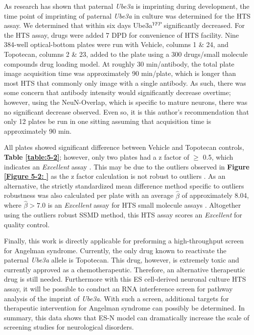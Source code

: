 As research has shown that paternal \textit{Ube3a} is imprinting during development, the time point of imprinting of paternal \textit{Ube3a} in culture was determined for the HTS assay. We determined that within six days Ube3a$^{YFP}$ significantly decreased. For the HTS assay, drugs were added 7 DPD for convenience of HTS facility. Nine 384-well optical-bottom plates were run with Vehicle, columns 1 \& 24, and Topotecan, columns 2 \& 23, added to the plate using a 300 drugs/small molecule compounds drug loading model. At roughly 30 min/antibody, the total plate image acquisition time was approximately 90 min/plate, which is longer than most HTS that commonly only image with a single antibody. As such, there was some concern that antibody intensity would significantly decrease overtime; however, using the NeuN-Overlap, which is specific to mature neurons, there was no significant decrease observed. Even so, it is this author's recommendation that only 12 plates be run in one sitting assuming that acquisition time is approximately 90 min.

All plates showed significant difference between Vehicle and Topotecan controls, \textbf{Table \ref{table:5-2}}; however, only two plates had a z factor of $\geq$ 0.5, which indicates an \textit{Excellent} assay \cite{Zhang1999}. This may be due to the outliers observed in \textbf{Figure \ref{Figure 5-2: }} as the z factor calculation is not robust to outliers \cite{Sui2007}. As an alternative, the strictly standardized mean difference method specific to outliers robustness was also calculated per plate with an average $\hat{\beta}$ of approximately 8.04, where $\hat{\beta} > 7.0$ is an \textit{Excellent} assay for HTS small molecule assays \cite{Zhang2011}. Altogether using the outliers robust SSMD method, this HTS assay scores an \textit{Excellent} for quality control.

Finally, this work is directly applicable for preforming a high-throughput screen for Angelman syndrome. Currently, the only drug known to reactivate the paternal \textit{Ube3a} allele is Topotecan. This drug, however, is extremely toxic and currently approved as a chemotherapeutic. Therefore, an alternative therapeutic drug is still needed. Furthermore with this ES cell-derived neuronal culture HTS assay, it will be possible to conduct an RNA interference screen for pathway analysis of the imprint of \textit{Ube3a}. With such a screen, additional targets for therapeutic intervention for Angelman syndrome can possibly be determined. In summary, this data shows that ES-N model can dramatically increase the scale of screening studies for neurological disorders.
